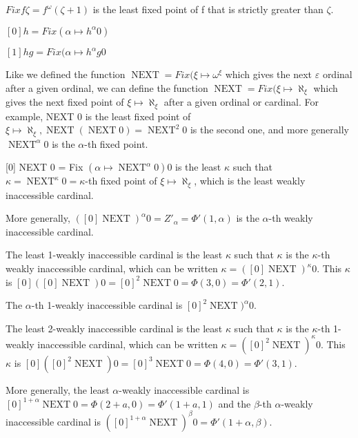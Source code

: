 \documentclass[10pt]{article}
\begin{document}
\( Fix f \zeta = f^\omega (\zeta+1) \) is the least fixed point of f that is strictly greater than \( \zeta \).

\( [0] h = Fix (\alpha \mapsto h^\alpha 0) \)

\( [1] h g = Fix (\alpha \mapsto h^\alpha g 0  \)

Like we defined the function \( \operatorname{NEXT} = Fix (\xi \mapsto \omega^\xi \) which gives the next \( \varepsilon \) ordinal after a given ordinal, we can define the function \( \operatorname{NEXT} = Fix (\xi \mapsto \aleph_\xi \) which gives the next fixed point of \( \xi \mapsto \aleph_\xi \) after a given ordinal or cardinal. For example, NEXT 0 is the least fixed point of \( \xi \mapsto \aleph_\xi, \operatorname{NEXT} (\operatorname{NEXT} 0) = \operatorname{NEXT}^2 0 \) is the second one, and more generally \( \operatorname{NEXT}^\alpha 0\) is the \(\alpha\)-th fixed point.

[0] NEXT 0 = Fix \( (\alpha \mapsto \operatorname{NEXT}^\alpha 0) 0 \) is the least \( \kappa \) such that \( \kappa = \operatorname{NEXT}^\kappa 0 = \kappa\)-th fixed point of \( \xi \mapsto \aleph_\xi \), which is the least weakly inaccessible cardinal.

More generally, \( ([0] \operatorname{NEXT})^\alpha 0 = Z'_\alpha = \Phi'(1,\alpha) \) is the \(\alpha\)-th weakly inaccessible cardinal.

The least 1-weakly inaccessible cardinal is the least \( \kappa \) such that \( \kappa \) is the \(\kappa\)-th weakly inaccessible cardinal, which can be written \( \kappa = ([0] \operatorname{NEXT})^\kappa 0 \). This \( \kappa \) is \( [0] ([0] \operatorname{NEXT}) 0 = [0]^2 \operatorname{NEXT} 0 = \Phi(3,0) = \Phi'(2,1) \).

The \(\alpha\)-th 1-weakly inaccessible cardinal is \( [0]^2 \operatorname{NEXT})^\alpha 0 \).

The least 2-weakly inaccessible cardinal is the least \( \kappa \) such that \( \kappa \) is the \(\kappa\)-th 1-weakly inaccessible cardinal, which can be written \( \kappa = ([0]^2 \operatorname{NEXT})^\kappa 0 \). This \( \kappa \) is \( [0] ([0]^2 \operatorname{NEXT}) 0 = [0]^3 \operatorname{NEXT} 0 = \Phi(4,0) = \Phi'(3,1) \).

More generally, the least \(\alpha\)-weakly inaccessible cardinal is \( [0]^{1+\alpha} \operatorname{NEXT} 0 = \Phi(2+a,0) = \Phi'(1+a,1) \) and the \(\beta\)-th \(\alpha\)-weakly inaccessible cardinal is \( ([0]^{1+\alpha} \operatorname{NEXT})^\beta 0 = \Phi'(1+\alpha,\beta) \).
\end{document}

